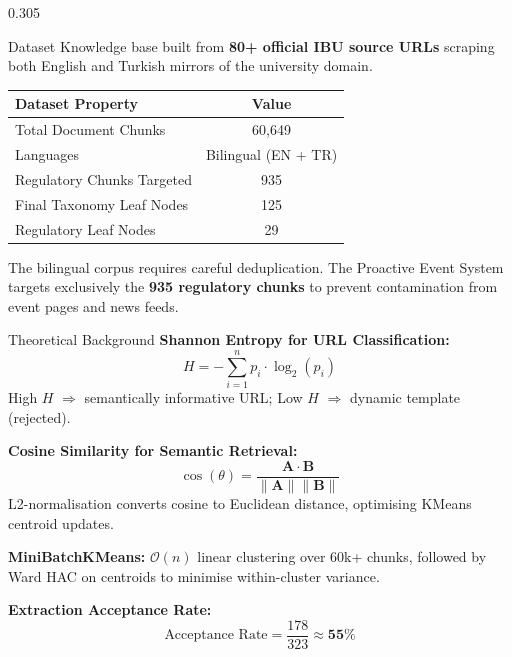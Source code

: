 \documentclass[final]{beamer}
\begin{document}
\begin{frame}[t]
\begin{columns}[T]
\begin{column}{0.305\paperwidth}
\begin{block}{Dataset}
Knowledge base built from \textbf{80+ official IBU source URLs}
scraping both English and Turkish mirrors of the university
domain.

\vskip0.30cm
\begin{center}
\begin{tabular}{lc}
  \toprule
  \textbf{Dataset Property}   & \textbf{Value} \\
  \midrule
  Total Document Chunks       & 60,649 \\
  Languages                   & Bilingual (EN + TR) \\
  Regulatory Chunks Targeted  & 935 \\
  Final Taxonomy Leaf Nodes   & 125 \\
  Regulatory Leaf Nodes       & 29 \\
  \bottomrule
\end{tabular}
\end{center}

\vskip0.25cm
The bilingual corpus requires careful deduplication.
The Proactive Event System targets exclusively the
\textbf{935 regulatory chunks} to prevent contamination
from event pages and news feeds.
\end{block}

\begin{block}{Theoretical Background}
\textbf{Shannon Entropy for URL Classification:}
$$H = -\sum_{i=1}^{n} p_i \cdot \log_2(p_i)$$
High $H$ $\Rightarrow$ semantically informative URL;
Low $H$ $\Rightarrow$ dynamic template (rejected).

\vskip0.40cm
\textbf{Cosine Similarity for Semantic Retrieval:}
$$\cos(\theta) = \frac{\mathbf{A} \cdot \mathbf{B}}%
                      {\|\mathbf{A}\| \|\mathbf{B}\|}$$
L2-normalisation converts cosine to Euclidean distance,
optimising KMeans centroid updates.

\vskip0.40cm
\textbf{MiniBatchKMeans:} $\mathcal{O}(n)$ linear clustering
over 60k+ chunks, followed by Ward HAC on centroids to
minimise within-cluster variance.

\vskip0.40cm
\textbf{Extraction Acceptance Rate:}
$$\text{Acceptance Rate} = \frac{178}{323} \approx \mathbf{55\%}$$
\end{block}

\end{column}


\end{columns}
\end{frame}
\end{document}
